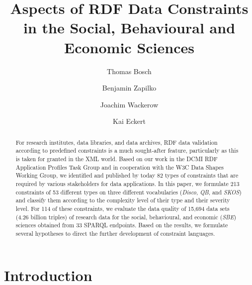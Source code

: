 \documentclass{llncs}
\begin{document}
\renewcommand{\arraystretch}{1.3}
\title{Aspects of RDF Data Constraints in the Social, Behavioural and Economic Sciences}
\subtitle{}

%
\author{Thomas Bosch \and Benjamin Zapilko \and Joachim Wackerow \and Kai Eckert}
%
\authorrunning{} %
%

\maketitle              %

\begin{abstract}

For research institutes, data libraries, and data archives,
RDF data validation according to predefined constraints is a much sought-after feature, 
particularly as this is taken for granted in the XML world.
Based on our work in the DCMI RDF Application Profiles Task Group and in cooperation with the W3C Data Shapes Working Group, we identified and published by today 82 types of constraints that are required by various stakeholders for data applications.
In this paper, we formulate 213 constraints of 53 different types on three different vocabularies (\emph{Disco}, \emph{QB}, and \emph{SKOS}) and classify them according to the complexity level of their type and their severity level. For 114 of these constraints, we evaluate the data quality of 15,694 data sets (4.26 billion triples) of research data for the social, behavioural, and economic (\emph{SBE}) sciences obtained from 33 SPARQL endpoints.
Based on the results, we formulate several hypotheses to direct the further development of constraint languages.


\end{abstract}

\section{Introduction}
\end{document}
